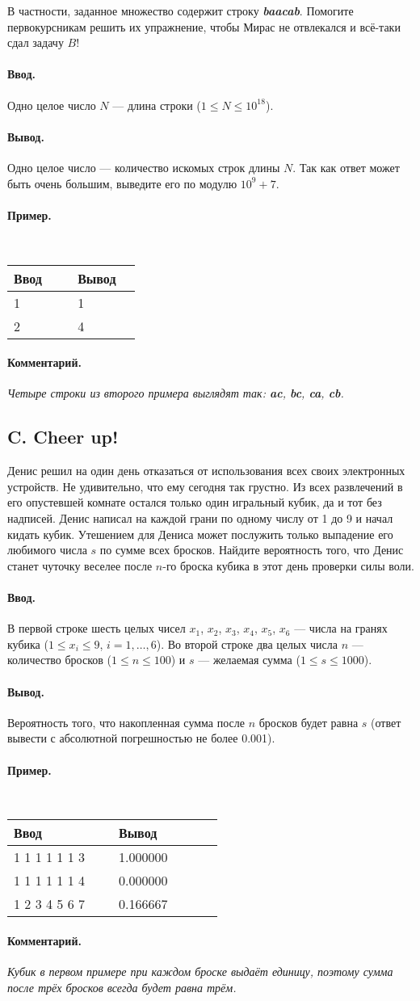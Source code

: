 \documentclass[10pt, a5paper]{article}
\newcommand{\informat}[1]
{
	\paragraph{Ввод.\\} #1
}
\newcommand{\outformat}[1]
{
	\paragraph{Вывод.\\} #1
}
\newcommand{\examplee}[4]
{
	\paragraph{Пример.\\}
	{\tt
	\begin{tabular}{|p{0.4\linewidth}|p{0.4\linewidth}|}
	\hline
	Ввод 	& Вывод  	\\
	\hline
	#1 		& #2 		\\
	\hline
	#3		& #4		\\
	\hline
	\end{tabular}
	}
}
\newcommand{\exampleee}[6]
{
	\paragraph{Пример.\\}
	{\tt
	\begin{tabular}{|p{0.4\linewidth}|p{0.4\linewidth}|}
	\hline
	Ввод 	& Вывод  	\\
	\hline
	#1 		& #2 		\\
	\hline
	#3		& #4		\\
	\hline
	#5		& #6		\\
	\hline
	\end{tabular}
	}
}
\newcommand{\excomm}[1]
{
	\paragraph{Комментарий. \\}
	\textit{#1}
}
\begin{document}
В частности, заданное множество содержит строку \textit{\textbf{baacab}}. Помогите первокурсникам решить их упражнение, чтобы Мирас не отвлекался и всё-таки сдал задачу $B$!

\informat{Одно целое число $N$ --- длина строки ($1 \le N \le {10}^{18}$).}

\outformat{Одно целое число --- количество искомых строк длины $N$. Так как ответ может быть очень большим, выведите его по модулю $10^9+7$.}

\examplee{1}{1}{2}{4}

\excomm{Четыре строки из второго примера выглядят так: \textit{\textbf{ac}}, \textit{\textbf{bc}}, \textit{\textbf{ca}}, \textit{\textbf{cb}}.}



\subsection*{C. Cheer up!}

Денис решил на один день отказаться от использования всех своих электронных устройств. Не удивительно, что ему сегодня так грустно. Из всех развлечений в его опустевшей комнате остался только один игральный кубик, да и тот без надписей. Денис написал на каждой грани по одному числу от 1 до 9 и начал кидать кубик. Утешением для Дениса может послужить только выпадение его любимого числа $s$ по сумме всех бросков. Найдите вероятность того, что Денис станет чуточку веселее после $n$-го броска кубика в этот день проверки силы воли.

\informat{В первой строке шесть целых чисел $x_1$, $x_2$, $x_3$, $x_4$, $x_5$, $x_6$ --- числа на гранях кубика ($1 \le x_i \le 9$, $i = 1, \dots, 6$). Во второй строке два целых числа $n$ --- количество бросков ($1 \le n \le 100$) и $s$ --- желаемая сумма ($1 \le s \le 1000$).}

\outformat{Вероятность того, что накопленная сумма после $n$ бросков будет равна $s$ (ответ вывести с абсолютной погрешностью не более 0.001).}

\exampleee{1 1 1 1 1 1 \newline 3 3}{1.000000}{1 1 1 1 1 1 \newline 3 4}{0.000000}{1 2 3 4 5 6 \newline 2 7}{0.166667}

\excomm{Кубик в первом примере при каждом броске выдаёт единицу, поэтому сумма после трёх бросков всегда будет равна трём.}
\end{document}
